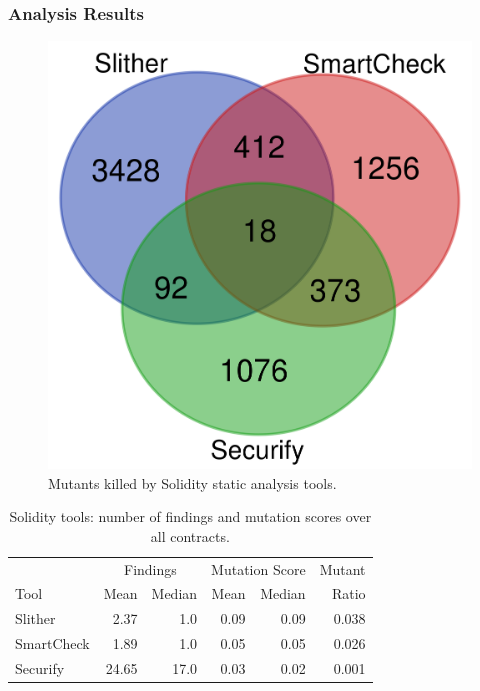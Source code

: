 \subsubsection{Analysis Results}

\begin{figure}
  \includegraphics[width=\columnwidth]{solidity.png}
  \caption{Mutants killed by Solidity static analysis tools.}
  \label{fig:solidityvenn}
\end{figure}

\begin{table}
  \begin{tabular}{l|r|r|r|r|r}
    & \multicolumn{2}{|c|}{Findings} & \multicolumn{2}{|c|}{Mutation Score}  & Mutant \\
    Tool & Mean & Median & Mean & Median & Ratio\\
    \hline
    \hline
    Slither & 2.37 & 1.0 & 0.09 & 0.09 & 0.038 \\
    \hline
    SmartCheck & 1.89 & 1.0 & 0.05 & 0.05 & 0.026 \\
    \hline
    Securify & 24.65 & 17.0 & 0.03 & 0.02 &  0.001 \\
    \hline
  \end{tabular}
  \caption{Solidity tools: number of findings and mutation scores over all contracts.}
  \label{tab:scoresolidity}
\end{table}

